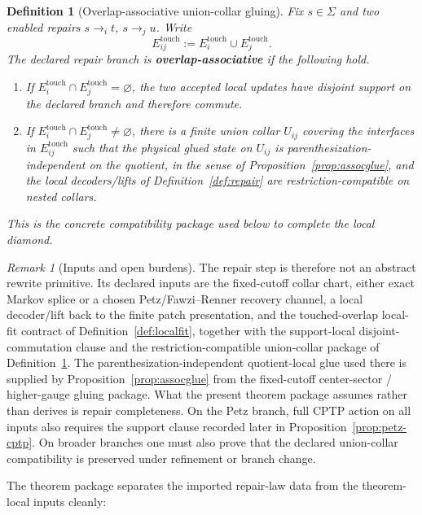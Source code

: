 \documentclass[11pt]{article}
\newtheorem{definition}[theorem]{Definition}
\theoremstyle{remark}
\newtheorem{remark}[theorem]{Remark}
\theoremstyle{plain}
\begin{document}
\begin{definition}[Overlap-associative union-collar gluing]\label{def:assoc}
Fix \(s\in\Sigma\) and two enabled repairs \(s\to_i t\), \(s\to_j u\). Write
\[
E_{ij}^{\mathrm{touch}}
:=
E_i^{\mathrm{touch}}\cup E_j^{\mathrm{touch}}.
\]
The declared repair branch is \textbf{overlap-associative} if the following hold.
\begin{enumerate}[label=(\roman*),leftmargin=2em]
\item If \(E_i^{\mathrm{touch}}\cap E_j^{\mathrm{touch}}=\varnothing\), the two accepted local
updates have disjoint support on the declared branch and therefore commute.
\item If \(E_i^{\mathrm{touch}}\cap E_j^{\mathrm{touch}}\neq\varnothing\), there is a finite union
collar \(U_{ij}\) covering the interfaces in \(E_{ij}^{\mathrm{touch}}\) such that the physical
glued state on \(U_{ij}\) is parenthesization-independent on the quotient, in the sense of
Proposition~\ref{prop:assocglue}, and the local decoders/lifts of
Definition~\ref{def:repair} are restriction-compatible on nested collars.
\end{enumerate}
This is the concrete compatibility package used below to complete the local diamond.
\end{definition}

\begin{remark}[Inputs and open burdens]\label{rem:repair-burdens}
The repair step is therefore not an abstract rewrite primitive. Its declared inputs are the
fixed-cutoff collar chart, either exact Markov splice or a chosen Petz/Fawzi--Renner recovery
channel, a local decoder/lift back to the finite patch presentation, and the touched-overlap
local-fit contract of Definition~\ref{def:localfit}, together with the support-local
disjoint-commutation clause and the restriction-compatible union-collar package of
Definition~\ref{def:assoc}. The
parenthesization-independent quotient-local glue used there is supplied by
Proposition~\ref{prop:assocglue} from the fixed-cutoff center-sector / higher-gauge gluing
package. What the present theorem package assumes rather than derives is repair
completeness. On the Petz branch, full CPTP action on all inputs also requires the support clause
recorded later in Proposition~\ref{prop:petz-cptp}. On broader branches one must also prove that
the declared union-collar compatibility is preserved under refinement or branch change.
\end{remark}

The theorem package separates the imported repair-law data from the theorem-local inputs cleanly:
\end{document}
